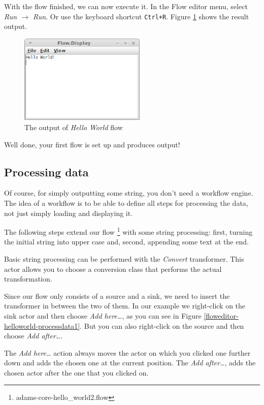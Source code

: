 With the flow finished, we can now execute it. In the Flow editor menu, select
\textit{Run $\rightarrow$ Run}. Or use the keyboard shortcut
\texttt{Ctrl+R}. Figure \ref{floweditor-helloworld-output} shows the result
output.

\begin{figure}[htb]
  \centering
  \includegraphics[width=6.0cm]{images/floweditor-helloworld-output.png}
  \caption{The output of \textit{Hello World} flow}
  \label{floweditor-helloworld-output}
\end{figure}

Well done, your first flow is set up and produces output!

\clearpage
\subsection{Processing data}
Of course, for simply outputting some string, you don't need a workflow engine.
The idea of a workflow is to be able to define all steps for
processing the data, not just simply loading and displaying it.

The following steps extend our flow \footnote{adams-core-hello\_world2.flow}
with some string processing: first, turning the initial string into upper case
and, second, appending some text at the
end.

Basic string processing can be performed with the \textit{Convert} transformer.
This actor allows you to choose a conversion class that performs the actual
transformation.

Since our flow only consists of a source and a sink, we need to insert the
transformer in between the two of them. In our example we right-click on the
sink actor and then choose \textit{Add here\ldots}, as you can see in Figure
\ref{floweditor-helloworld-processdata1}. But you can also right-click on the
source and then choose \textit{Add after\ldots}.

The \textit{Add here\ldots} action always moves the actor on which you clicked
one further down and adds the chosen one at the current position. The
\textit{Add after\ldots}, adds the chosen actor after the one that you clicked
on.

